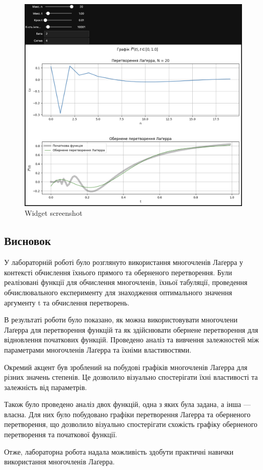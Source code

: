 \documentclass[11pt]{article}
\begin{document}
    \begin{figure}
\centering
\includegraphics{screenshots/8.png}
\caption{Widget screenshot}
\end{figure}
\newpage

    \subsection*{Висновок}\label{ux432ux438ux441ux43dux43eux432ux43eux43a}

У лабораторній роботі було розглянуто використання многочленів Лаґерра у
контексті обчислення їхнього прямого та оберненого перетворення. Були
реалізовані функції для обчислення многочленів, їхньої табуляції,
проведення обчислювального експерименту для знаходження оптимального
значення аргументу t та обчислення перетворень.

В результаті роботи було показано, як можна використовувати многочлени
Лаґерра для перетворення функцій та як здійснювати обернене перетворення
для відновлення початкових функцій. Проведено аналіз та вивчення
залежностей між параметрами многочленів Лаґерра та їхніми властивостями.

Окремий акцент був зроблений на побудові графіків многочленів Лаґерра
для різних значень степенів. Це дозволило візуально спостерігати їхні
властивості та залежність від параметрів.

Також було проведено аналіз двох функцій, одна з яких була задана, а
інша --- власна. Для них було побудовано графіки перетворення Лаґерра та
оберненого перетворення, що дозволило візуально спостерігати схожість
графіку оберненого перетворення та початкової функції.

Отже, лабораторна робота надала можливість здобути практичні навички
використання многочленів Лаґерра.


    
    
    
\end{document}
